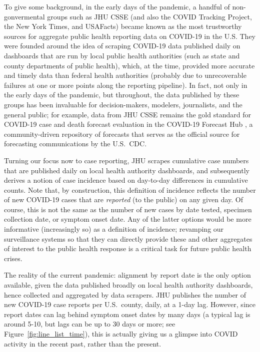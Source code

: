 \documentclass[sts]{imsart}
\theoremstyle{plain}
\theoremstyle{definition}
\theoremstyle{remark}
\begin{document}
To give some background, in the early days of the pandemic, a handful of
non-gonvermental groups such as JHU CSSE \citep{Dong:2020} (and also the COVID
Tracking Project, the New York Times, and USAFacts) became known as the most 
trustworthy sources for aggregate public health reporting data on COVID-19 in
the U.S. They were founded around the idea of scraping COVID-19 data published
daily on dashboards that are run by local public health authorities (such as
state and county departments of public health), which, at the time, provided
more accurate and timely data than federal health authorities (probably due to
unrecoverable failures at one or more points along the reporting pipeline). In
fact, not only in the early days of the pandemic, but throughout, the data
published by these groups has been invaluable for decision-makers, modelers,
journalists, and the general public; for example, data from JHU CSSE remains the
gold standard for COVID-19 case and death forecast evaluation in the COVID-19
Forecast Hub \citep{ForecastHub}, a community-driven repository of forecasts
that serves as the official source for forecasting communications by the U.S.\
CDC.

Turning our focus now to case reporting, JHU scrapes cumulative case numbers
that are published daily on local health authority dashboards, and subsequently
derives a notion of case incidence based on day-to-day differences in cumulative
counts. Note that, by construction, this definition of incidence reflects the
number of new COVID-19 cases that are \emph{reported} (to the public) on any
given day. Of course, this is not the same as the number of new cases by date
tested, specimen collection date, or symptom onset date. Any of the latter
options would be more informative (increasingly so) as a definition of
incidence; revamping our surveillance systems so that they can directly provide
these and other aggregates of interest to the public health response is a
critical task for future public health crises.

 The reality of the current pandemic: alignment by report date is the only
option available, given the data published broadly on local health authority
dashboards, hence collected and aggregated by data scrapers. JHU publishes the
number of new COVID-19 case reports per U.S.\ county, daily, at a 1-day
lag. However, since report dates can lag behind symptom onset dates by many days
(a typical lag is around 5-10, but lags can be up to 30 days or more; see
Figure~\ref{fig:line_list_time}), this is actually giving us a glimpse into
COVID activity in the recent past, rather than the present.
\end{document}
